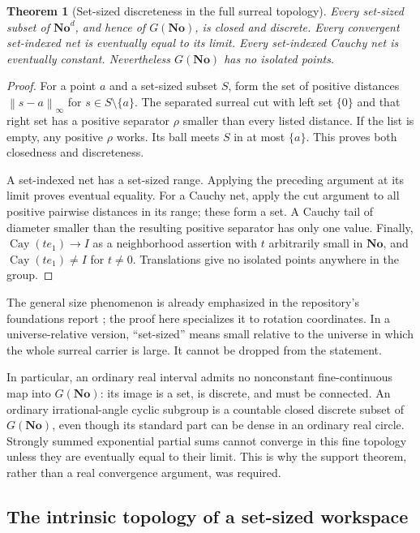 \documentclass[11pt,letterpaper]{article}
\numberwithin{equation}{section}
\newtheorem{theorem}{Theorem}[section]
\theoremstyle{definition}
\theoremstyle{remark}
\newcommand{\No}{\mathbf{No}}
\newcommand{\cay}{\operatorname{Cay}}
\newcommand{\norm}[1]{\left\lVert#1\right\rVert}
\begin{document}
\begin{theorem}[Set-sized discreteness in the full surreal topology]
\label{e3:so:thm:finediscrete}
Every set-sized subset of \(\No^d\), and hence of \(G(\No)\), is closed and
discrete. Every convergent set-indexed net is eventually equal to its limit.
Every set-indexed Cauchy net is eventually constant. Nevertheless \(G(\No)\)
has no isolated points.
\end{theorem}
\begin{proof}
For a point \(a\) and a set-sized subset \(S\), form the set of positive
distances \(\norm{s-a}_{\infty}\) for \(s\in S\setminus\{a\}\).
The separated surreal cut with left set \(\{0\}\) and that right set has a
positive separator \(\rho\) smaller than every listed distance. If the list
is empty, any positive \(\rho\) works. Its ball meets \(S\) in at most
\(\{a\}\). This proves both closedness and discreteness.

A set-indexed net has a set-sized range. Applying the preceding argument at
its limit proves eventual equality. For a Cauchy net, apply the cut argument
to all positive pairwise distances in its range; these form a set. A Cauchy
tail of diameter smaller than the resulting positive separator has only one
value. Finally, \(\cay(te_1)\to I\) as a neighborhood assertion with \(t\)
arbitrarily small in \(\No\), and \(\cay(te_1)\ne I\) for \(t\ne0\).
Translations give no isolated points anywhere in the group.
\end{proof}

The general size phenomenon is already emphasized in the repository's
foundations report \cite{RepoFoundations}; the proof here specializes it to
rotation coordinates. In a universe-relative version, ``set-sized'' means
small relative to the universe in which the whole surreal carrier is large.
It cannot be dropped from the statement.

In particular, an ordinary real interval admits no nonconstant fine-continuous
map into \(G(\No)\): its image is a set, is discrete, and must be connected.
An ordinary irrational-angle cyclic subgroup is a countable closed discrete
subset of \(G(\No)\), even though its standard part can be dense in an ordinary
real circle. Strongly summed exponential partial sums cannot converge in this
fine topology unless they are eventually equal to their limit. This is why the
support theorem, rather than a real convergence argument, was required.

\subsection{The intrinsic topology of a set-sized workspace}
\end{document}
